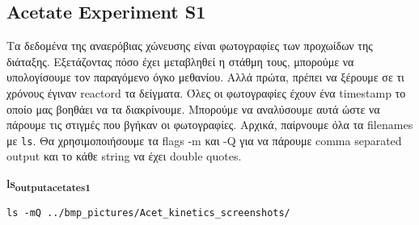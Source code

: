 \documentclass[11pt]{article}
\begin{document}
\subsection{Acetate Experiment S1}
\label{sec:org4b07e10}
Τα δεδομένα της αναερόβιας χώνευσης είναι φωτογραφίες των προχωίδων της διάταξης. Εξετάζοντας πόσο έχει μεταβληθεί η στάθμη τους, μπορούμε να υπολογίσουμε τον παραγόμενο όγκο μεθανίου. Αλλά πρώτα, πρέπει να ξέρουμε σε τι χρόνους έγιναν reactord τα δείγματα. Όλες οι φωτογραφίες έχουν ένα timestamp το οποίο μας βοηθάει να τα διακρίνουμε. Μπορούμε να αναλύσουμε αυτά ώστε να πάρουμε τις στιγμές που βγήκαν οι φωτογραφίες. Αρχικά, παίρνουμε όλα τα filenames με \texttt{ls}. Θα χρησιμοποιήσουμε τα flags -m και -Q για να πάρουμε comma separated output και το κάθε string να έχει double quotes.

\textbf{ls\textsubscript{output}\textsubscript{acetate}\textsubscript{s1}}
\begin{verbatim}
ls -mQ ../bmp_pictures/Acet_kinetics_screenshots/
\end{verbatim}
\end{document}
